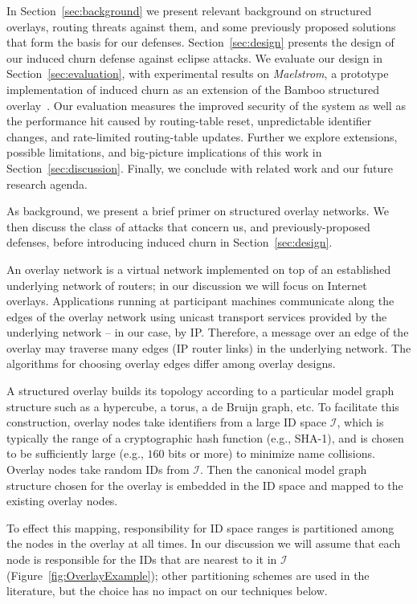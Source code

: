 \documentclass[10pt,twocolumn]{article}
\begin{document}
In Section~\ref{sec:background} we present relevant background on
structured overlays, routing threats against them, and some
previously proposed solutions that form the basis for our defenses.
Section~\ref{sec:design} presents the design of our induced churn
defense against eclipse attacks.  We evaluate our design in
Section~\ref{sec:evaluation}, with experimental results on
\emph{Maelstrom}, a prototype
implementation of induced churn as an extension of the Bamboo structured
overlay~\cite{Rhea2004}. Our evaluation measures the improved security of the system
as well as the performance hit caused by routing-table reset, unpredictable identifier changes, and rate-limited routing-table updates.
Further we explore extensions, possible limitations, and big-picture implications
of this work in Section~\ref{sec:discussion}.  Finally, we conclude with
related work and our future research agenda.  


\label{sec:background}
As background, we present a brief primer
on structured overlay networks.  We
then discuss the class of attacks that concern us, and previously-proposed
defenses, before introducing induced churn in Section~\ref{sec:design}.


\label{sec:structuredOverlays}
An overlay network is a virtual network implemented on top of an
established underlying network of routers; in our discussion we will
focus on Internet overlays. Applications running at participant
machines communicate along the edges of the overlay network using
unicast transport services provided by the underlying network -- in
our case, by IP. Therefore, a message over an edge of 
the overlay may traverse many edges (IP router links) in the
underlying network. The algorithms for choosing overlay
edges differ among overlay designs.

A structured overlay builds its topology according to a particular model
graph
structure such as a hypercube, a torus, a de Bruijn graph, etc.  To
facilitate this construction, overlay nodes take identifiers from a
large ID space $\mathcal{I}$, which is typically the range of a
cryptographic
hash function (e.g., SHA-1), and is chosen to be sufficiently large (e.g.,
$160$ bits or more) to minimize name
collisions.  Overlay nodes take random IDs from $\mathcal{I}$.  Then the canonical model graph structure chosen
for the overlay is embedded in the ID space and mapped to the
existing overlay nodes.

To effect this mapping, responsibility for ID space ranges is
partitioned among the nodes in the overlay at all times.  In our discussion we will
assume that each node is responsible for the IDs that are nearest to
it in $\mathcal{I}$ (Figure~\ref{fig:OverlayExample}); other partitioning
schemes are used in the literature, but the choice has no impact on
our techniques below.
\end{document}

